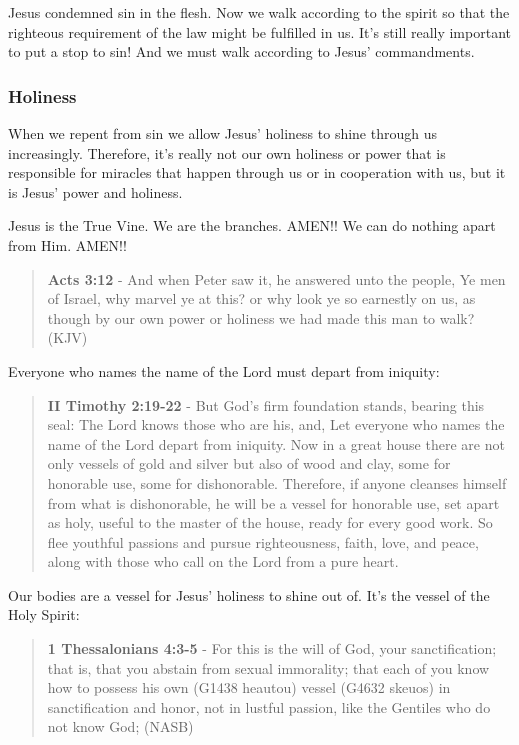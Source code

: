 \documentclass[11pt]{article}
\begin{document}
Jesus condemned sin in the flesh. Now we walk according to the spirit so that the righteous requirement of the law might be fulfilled in us.
It's still really important to put a stop to sin! And we must walk according to Jesus' commandments.

\subsubsection{Holiness}
\label{sec:orgb912b8e}
When we repent from sin we allow Jesus' holiness to shine through us increasingly.
Therefore, it's really not our own holiness or power that is responsible for miracles that happen through us or in cooperation with us, but it is Jesus' power and holiness.

Jesus is the True Vine. We are the branches. AMEN!! We can do nothing apart from Him. AMEN!!

\begin{quote}
\textbf{Acts 3:12} - And when Peter saw it, he answered unto the people, Ye men of Israel, why marvel ye at this? or why look ye so earnestly on us, as though by our own power or holiness we had made this man to walk? (KJV)
\end{quote}

Everyone who names the name of the Lord must depart from iniquity:

\begin{quote}
\textbf{II Timothy 2:19-22} - But God's firm foundation stands, bearing this seal: The Lord knows those who are his, and, Let everyone who names the name of the Lord depart from iniquity. Now in a great house there are not only vessels of gold and silver but also of wood and clay, some for honorable use, some for dishonorable. Therefore, if anyone cleanses himself from what is dishonorable, he will be a vessel for honorable use, set apart as holy, useful to the master of the house, ready for every good work. So flee youthful passions and pursue righteousness, faith, love, and peace, along with those who call on the Lord from a pure heart.
\end{quote}

Our bodies are a vessel for Jesus' holiness to shine out of. It's the vessel of the Holy Spirit:

\begin{quote}
\textbf{1 Thessalonians 4:3-5} - For this is the will of God, your sanctification; that is, that you abstain from sexual immorality; that each of you know how to possess his own (G1438 heautou) vessel (G4632 skeuos) in sanctification and honor, not in lustful passion, like the Gentiles who do not know God; (NASB)
\end{quote}
\end{document}
